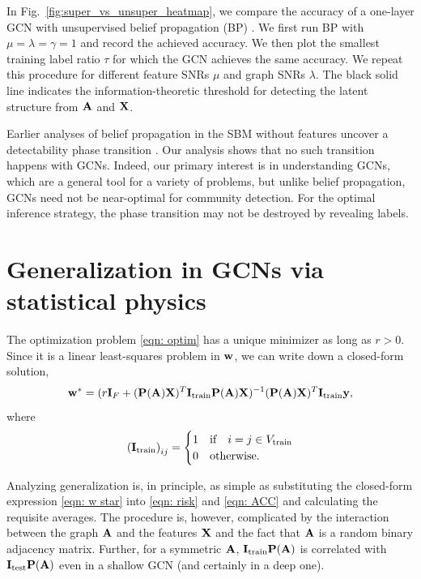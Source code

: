 \documentclass[9pt,twocolumn]{pnas-new}
\begin{document}
In Fig.~\ref{fig:super_vs_unsuper_heatmap}, we compare the accuracy of a one-layer GCN with unsupervised belief propagation (BP) \cite{deshpande2018contextual}. We first run BP with $\mu=\lambda=\gamma=1$ and record the achieved accuracy. We then plot the smallest training label ratio $\tau$ for which the GCN achieves the same accuracy. We repeat this procedure for different feature SNRs $\mu$ and graph SNRs $\lambda$. The black solid line indicates the information-theoretic threshold for detecting the latent structure from $\mathbf{A}$ and $\mathbf{X}$. 

Earlier analyses of belief propagation in the SBM without features uncover a detectability phase transition \cite{zhang2014phase}. Our analysis shows that no such transition happens with GCNs. Indeed, our primary interest is in understanding GCNs, which are a general tool for a variety of problems, but unlike belief propagation, GCNs need not be near-optimal for community detection. For the optimal inference strategy, the phase transition may not be destroyed by revealing labels.




\section{Generalization in GCNs via statistical physics}\label{sec: main techniques}


The optimization problem \eqref{eqn: optim} has a unique minimizer as long as $r > 0$. Since it is a linear least-squares problem in $\mathbf{w}$, we can write down a closed-form solution,
\begin{equation}\label{eqn: w star}
    \mathbf{w}^*= (r\mathbf{I}_F+ (\mathbf{P}(\mathbf{A}) \mathbf{X})^T \mathbf{I}_{\text{train}} \mathbf{P}(\mathbf{A}) \mathbf{X})^{-1} (\mathbf{P}(\mathbf{A})\mathbf{X})^T \mathbf{I}_{\text{train} }\mathbf{y},
\end{equation}
where
\begin{equation}\label{eqn: Itrain}
\left(\mathbf{I}_{\text{train}}\right)_{ij}=\begin{cases}
    1 & \text{if} \quad i=j\in V_{\text{train}}\\
    0 & \text{otherwise}.
\end{cases}
\end{equation}

Analyzing generalization is, in principle, as simple as substituting the closed-form expression \eqref{eqn: w star} into \eqref{eqn: risk} and \eqref{eqn: ACC} and calculating the requisite averages. The procedure is, however, complicated by the interaction between the graph $\mathbf{A}$ and the features $\mathbf{X}$ and the fact that $\mathbf{A}$ is a random binary adjacency matrix. Further, for a symmetric $\mathbf{A}$, $\mathbf{I}_{\text{train}}\mathbf{P}(\mathbf{A})$ is correlated with $\mathbf{I}_{\text{test}}\mathbf{P}(\mathbf{A})$ even in a shallow GCN (and certainly in a deep one).
\end{document}
